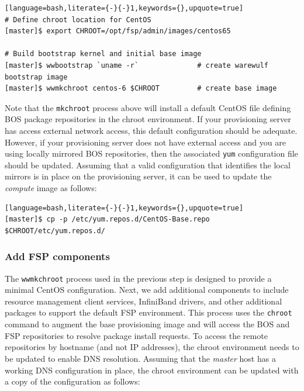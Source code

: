 \documentclass[letterpaper]{article}
\begin{document}

\begin{lstlisting}[language=bash,literate={-}{-}1,keywords={},upquote=true]
# Define chroot location for CentOS 
[master]$ export CHROOT=/opt/fsp/admin/images/centos65

# Build bootstrap kernel and initial base image
[master]$ wwbootstrap `uname -r`              # create warewulf bootstrap image
[master]$ wwmkchroot centos-6 $CHROOT         # create base image
\end{lstlisting}

Note that the \texttt{mkchroot} process above will install a default CentOS
file defining BOS package repositories in the chroot environment. If your
provisioning server has access external network access, this default configuration
should be adequate. However, if your provisioning server does not have external
access and you are using locally mirrored BOS repositories, then the associated
\texttt{yum} configuration file should be updated. Assuming that a valid
configuration that identifies the local mirrors is in place on the provisioning
server, it can be used to update the {\em compute} image as follows:

\begin{lstlisting}[language=bash,literate={-}{-}1,keywords={},upquote=true]
[master]$ cp -p /etc/yum.repos.d/CentOS-Base.repo $CHROOT/etc/yum.repos.d/
\end{lstlisting}



\subsubsection{Add FSP components}

The \texttt{wwmkchroot} process used in the previous step is designed to
provide a minimal CentOS configuration. Next, we add additional components to
include resource management client services, InfiniBand drivers, and other
additional packages to support the default FSP environment.  This process uses
the \texttt{chroot} command to augment the base provisioning image and will
access the BOS and FSP repositories to resolve package install requests. To
access the remote repositories by hostname (and not IP addresses), the chroot
environment needs to be updated to enable DNS resolution. Assuming that
the {\em master} host has a working DNS configuration in place, the chroot environment can
be updated with a copy of the configuration as follows:
\end{document}

